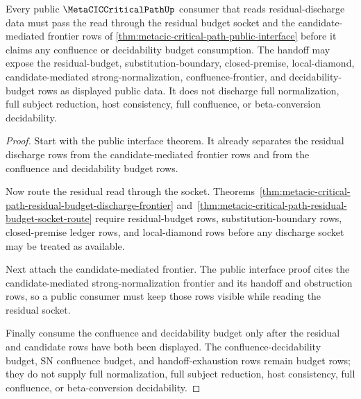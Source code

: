 \begin{theorem}
\label{thm:metacic-critical-path-residual-public-handoff}
Every public $\MetaCICCriticalPathUp$ consumer that reads residual-discharge data must pass the read through the residual budget socket and the candidate-mediated frontier rows of \autoref{thm:metacic-critical-path-public-interface} before it claims any confluence or decidability budget consumption. The handoff may expose the residual-budget, substitution-boundary, closed-premise, local-diamond, candidate-mediated strong-normalization, confluence-frontier, and decidability-budget rows as displayed public data. It does not discharge full normalization, full subject reduction, host consistency, full confluence, or beta-conversion decidability.
\end{theorem}
\begin{proof}
Start with the public interface theorem. It already separates the residual discharge rows from the candidate-mediated frontier rows and from the confluence and decidability budget rows.

Now route the residual read through the socket. Theorems~\ref{thm:metacic-critical-path-residual-budget-discharge-frontier} and~\ref{thm:metacic-critical-path-residual-budget-socket-route} require residual-budget rows, substitution-boundary rows, closed-premise ledger rows, and local-diamond rows before any discharge socket may be treated as available.

Next attach the candidate-mediated frontier. The public interface proof cites the candidate-mediated strong-normalization frontier and its handoff and obstruction rows, so a public consumer must keep those rows visible while reading the residual socket.

Finally consume the confluence and decidability budget only after the residual and candidate rows have both been displayed. The confluence-decidability budget, SN confluence budget, and handoff-exhaustion rows remain budget rows; they do not supply full normalization, full subject reduction, host consistency, full confluence, or beta-conversion decidability.
\end{proof}

